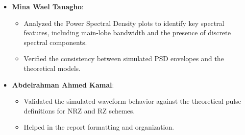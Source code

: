 \begin{itemize}
    \item \textbf{Mina Wael Tanagho}:
          \begin{itemize}
              \item Analyzed the Power Spectral Density plots to identify key spectral features,
                    including main-lobe bandwidth and the presence of discrete spectral components.
              \item Verified the consistency between simulated PSD envelopes and the theoretical
                    models.
          \end{itemize}

    \item \textbf{Abdelrahman Ahmed Kamal}:
          \begin{itemize}
              \item Validated the simulated waveform behavior against the theoretical pulse
                    definitions for NRZ and RZ schemes.
              \item Helped in the report formatting and organization.
          \end{itemize}
\end{itemize}